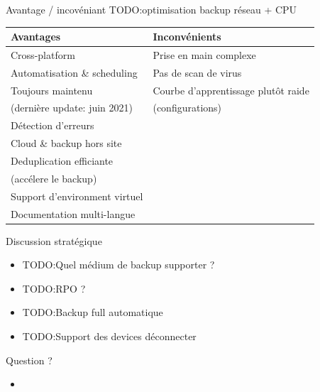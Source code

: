 \documentclass[aspectratio=169]{beamer}
\newcommand{\TODO}{TODO:}
\begin{document}
\begin{frame}{Avantage / incovéniant}
 \TODO optimisation backup réseau + CPU
    \begin{center}
     \begin{tabular}{|l|l|}
     \hline
      \textbf{Avantages} & \textbf{Inconvénients} \\
     \hline
     \hline
        Cross-platform & Prise en main complexe \\
     \hline
      Automatisation \& scheduling & Pas de scan de virus\\
     \hline
     Toujours maintenu  & Courbe d'apprentissage plutôt raide \\
     (dernière update: juin 2021) & (configurations) \\
     \hline
     Détection d'erreurs & \\
     \hline
     Cloud \& backup hors site & \\
     \hline
     Deduplication efficiante & \\
     (accélere le backup) & \\
     \hline
     Support d'environment virtuel & \\
     \hline
     Documentation multi-langue & \\
     \hline
     \end{tabular}

    \end{center}

\end{frame}

\begin{frame}{Discussion stratégique}
 \begin{itemize}
  \item \TODO Quel médium de backup supporter ?
  \item \TODO RPO ?
  \item \TODO Backup full automatique
  \item \TODO Support des devices déconnecter
 \end{itemize}
\end{frame}

\begin{frame}{Question ?}
 \begin{itemize}
  \item 
 \end{itemize}
\end{frame}
\end{document}
